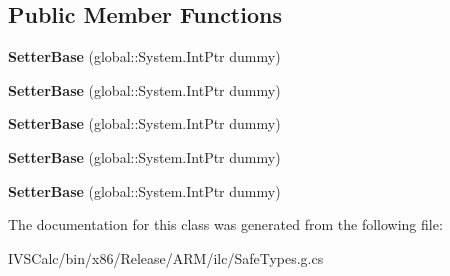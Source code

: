 \subsection*{Public Member Functions}
\begin{DoxyCompactItemize}
\item 
\mbox{\label{class_windows_1_1_u_i_1_1_xaml_1_1_setter_base_ad5b2ae432fc5eec1672c97a39163dfca}} 
{\bfseries Setter\+Base} (global\+::\+System.\+Int\+Ptr dummy)
\item 
\mbox{\label{class_windows_1_1_u_i_1_1_xaml_1_1_setter_base_ad5b2ae432fc5eec1672c97a39163dfca}} 
{\bfseries Setter\+Base} (global\+::\+System.\+Int\+Ptr dummy)
\item 
\mbox{\label{class_windows_1_1_u_i_1_1_xaml_1_1_setter_base_ad5b2ae432fc5eec1672c97a39163dfca}} 
{\bfseries Setter\+Base} (global\+::\+System.\+Int\+Ptr dummy)
\item 
\mbox{\label{class_windows_1_1_u_i_1_1_xaml_1_1_setter_base_ad5b2ae432fc5eec1672c97a39163dfca}} 
{\bfseries Setter\+Base} (global\+::\+System.\+Int\+Ptr dummy)
\item 
\mbox{\label{class_windows_1_1_u_i_1_1_xaml_1_1_setter_base_ad5b2ae432fc5eec1672c97a39163dfca}} 
{\bfseries Setter\+Base} (global\+::\+System.\+Int\+Ptr dummy)
\end{DoxyCompactItemize}


The documentation for this class was generated from the following file\+:\begin{DoxyCompactItemize}
\item 
I\+V\+S\+Calc/bin/x86/\+Release/\+A\+R\+M/ilc/Safe\+Types.\+g.\+cs\end{DoxyCompactItemize}

